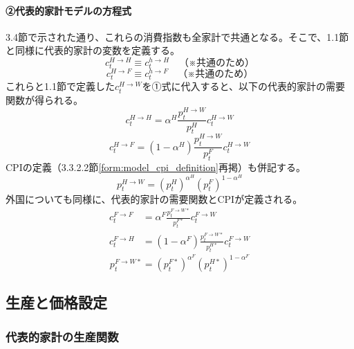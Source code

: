 \paragraph{②代表的家計モデルの方程式}\label{sec:model_final_equations_utility_demand_ra_eq}
3.4節で示された通り、これらの消費指数も全家計で共通となる。そこで、1.1節と同様に代表的家計の変数を定義する。
\begin{equation}
c_t^{H\to H}\equiv c_t^{h\to H}\quad（※共通のため）
\label{form:model_final_equations_utility_ra_h_h_def}
\end{equation}
\begin{equation}
c_t^{H\to F}\equiv c_t^{h\to F}\quad（※共通のため）
\label{form:model_final_equations_utility_ra_h_f_def}
\end{equation}
これらと1.1節で定義した\(c_t^{H\to W}\)を①式に代入すると、以下の代表的家計の需要関数が得られる。
\begin{equation}
c_t^{H\to H}=\alpha^H\frac{p_t^{H\to W}}{p_t^H}c_t^{H\to W}
\label{form:model_final_equations_utility_demand_h_h}
\end{equation}
\begin{equation}
c_t^{H\to F}=(1-\alpha^H)\frac{p_t^{H\to W}}{p_t^F}c_t^{H\to W}
\label{form:model_final_equations_utility_demand_h_f}
\end{equation}
CPIの定義（3.3.2.2節\eqref{form:model_cpi_definition}再掲）も併記する。
\begin{equation}
p_t^{H\to W}=(p_t^H)^{\alpha^H}(p_t^F)^{1-\alpha^H}
\label{form:model_final_equations_utility_cpi_h}
\end{equation}
外国についても同様に、代表的家計の需要関数とCPIが定義される。
\begin{align}
c_t^{F\to F}&=\alpha^F\frac{p_t^{F\to W*}}{p_t^{F*}}c_t^{F\to W} \label{form:model_final_equations_utility_demand_f_f} \\
c_t^{F\to H}&=(1-\alpha^F)\frac{p_t^{F\to W*}}{p_t^{H*}}c_t^{F\to W} \label{form:model_final_equations_utility_demand_f_h}
\end{align}
\begin{equation}
p_t^{F\to W*}=(p_t^{F*})^{\alpha^F}(p_t^{H*})^{1-\alpha^F}
\label{form:model_final_equations_utility_cpi_f}
\end{equation}

\subsection{生産と価格設定}
\label{sec:model_final_equations_pricing}
\subsubsection{代表的家計の生産関数}
\label{sec:model_final_equations_pricing_prod}
